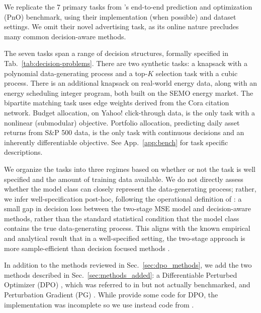 We replicate the 7 primary tasks from \citet{gengBenchmarkingPtOPnO2024}'s end-to-end prediction and optimization (PnO) benchmark, using their implementation (when possible) and dataset settings. We omit their novel advertising task, as its online nature precludes many common decision-aware methods.

The seven tasks span a range of decision structures, formally specified in Tab.~\ref{tab:decision-problems}. There are two synthetic tasks: a knapsack with a polynomial data-generating process and a top-$K$ selection task with a cubic process. There is an additional knapsack on real-world energy data, along with an energy scheduling integer program, both built on the SEMO energy market. The bipartite matching task uses edge weights derived from the Cora citation network. Budget allocation, on Yahoo! click-through data, is the only task with a nonlinear (submodular) objective. Portfolio allocation, predicting daily asset returns from S\&P 500 data, is the only task with continuous decisions and an inherently differentiable objective. See App.~\ref{app:bench} for task specific descriptions.

We organize the tasks into three regimes based on whether or not the task is well specified and the amount of training data available. We do not directly assess whether the model class can closely represent the data-generating process; rather, we infer well-specification post-hoc, following the operational definition of \citet{elmachtoubDissectingImpactModel2025}: a small gap in decision loss between the two-stage MSE model and decision-aware methods, rather than the standard statistical condition that the model class contains the true data-generating process. This aligns with the known empirical and analytical result that in a well-specified setting, the two-stage approach is more sample-efficient than decision focused methods \citep{elmachtoubDissectingImpactModel2025, huFastRatesContextual2022}.

In addition to the methods reviewed in Sec.~\ref{sec:dpo_methods}, we add the two methods described in Sec.~\ref{sec:methods_added}: a Differentiable Perturbed Optimizer (DPO) \citep{berthetLearningDifferentiablePerturbed2020}, which was referred to in \citet{gengBenchmarkingPtOPnO2024} but not actually benchmarked, and Perturbation Gradient (PG) \citep{huang2024decisionfocusedPG}. While \citet{gengBenchmarkingPtOPnO2024} provide some code for DPO, the implementation was incomplete so we use instead code from \citet{TueroPytorchDPO}.

